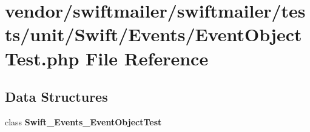 \section{vendor/swiftmailer/swiftmailer/tests/unit/\+Swift/\+Events/\+Event\+Object\+Test.php File Reference}
\label{_event_object_test_8php}
\subsection*{Data Structures}
\begin{DoxyCompactItemize}
\item 
class {\bf Swift\+\_\+\+Events\+\_\+\+Event\+Object\+Test}
\end{DoxyCompactItemize}
